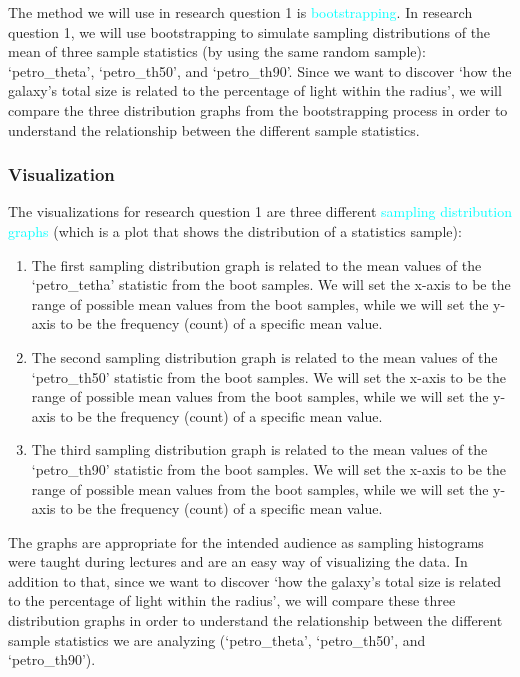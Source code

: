 \documentclass[12pt]{article}
\begin{document}
The method we will use in research question 1 is \textcolor{cyan}{bootstrapping}. In research question 1, we will use bootstrapping to simulate sampling distributions of the mean of three sample statistics (by using the same random sample): `petro\_theta', `petro\_th50', and `petro\_th90'. Since we want to discover `how the galaxy's total size is related to the percentage of light within the radius', we will compare the three distribution graphs from the bootstrapping process in order to understand the relationship between the different sample statistics. 

\subsubsection{Visualization}

The visualizations for research question 1 are three different \textcolor{cyan}{sampling distribution graphs} (which is a plot that shows the distribution of a statistics sample):

\begin{enumerate}
	\item The first sampling distribution graph is related to the mean values of the `petro\_tetha' statistic from the boot samples. We will set the x-axis to be the range of possible mean values from the boot samples, while we will set the y-axis to be the frequency (count) of a specific mean value. 
	\item The second sampling distribution graph is related to the mean values of the `petro\_th50' statistic from the boot samples. We will set the x-axis to be the range of possible mean values from the boot samples, while we will set the y-axis to be the frequency (count) of a specific mean value. 
	\item The third sampling distribution graph is related to the mean values of the `petro\_th90' statistic from the boot samples. We will set the x-axis to be the range of possible mean values from the boot samples, while we will set the y-axis to be the frequency (count) of a specific mean value. 
\end{enumerate}

\noindent The graphs are appropriate for the intended audience as sampling histograms were taught during lectures and are an easy way of visualizing the data. In addition to that, since we want to discover `how the galaxy's total size is related to the percentage of light within the radius', we will compare these three distribution graphs in order to understand the relationship between the different sample statistics we are analyzing (`petro\_theta', `petro\_th50', and `petro\_th90').
\end{document}
